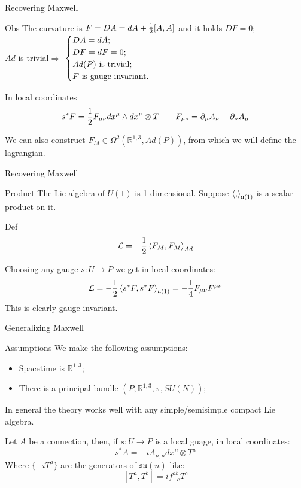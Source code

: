 \documentclass{beamer}
\begin{document}
\begin{frame}{Recovering Maxwell}
	\begin{exampleblock}{Obs}
		The curvature is $F=DA=dA+{1\over 2}[A,A]$ and it holds $DF=0;$\\
		$Ad$ is trivial$\Longrightarrow$ 
		$\begin{cases}
			DA=dA;\\
			DF=dF=0;\\
			Ad(P)\hbox{ is trivial;}\\  
			F \hbox{ is gauge invariant.}\\
		\end{cases}$
	\end{exampleblock}
	\begin{block}{In local coordinates}
		$$s^*F={1\over 2}F_{\mu\nu}dx^\mu\wedge dx^\nu\otimes T\hspace{20 pt} F_{\mu\nu}=\partial_\mu A_\nu-\partial_\nu A_\mu$$
	\end{block}
	We can also construct $F_M\in\Omega^2(\mathbb{R}^{1,3},Ad(P))$, from which we will define the lagrangian.
\end{frame}
\begin{frame}{Recovering Maxwell}
	\begin{block}{Product}
		The Lie algebra of $U(1)$ is 1 dimensional. Suppose $\braket{,}_{\mathfrak{u}(1)}$ is a scalar product on it.
	\end{block}
	\begin{exampleblock}{Def}
		$$\mathcal{L}=-{1\over 2}\braket{F_M,F_M}_{Ad}$$
	\end{exampleblock}
	Choosing any gauge $s:U\rightarrow P$ we get in local coordinates:
	$$\mathcal{L}=-{1\over 2}\braket{s^*F,s^*F}_{\mathfrak{u}(1)}=-{1\over 4}F_{\mu\nu}F^{\mu\nu}$$
	This is clearly gauge invariant.
\end{frame}
\begin{frame}{Generalizing Maxwell}
	\begin{exampleblock}{Assumptions}
	We make the following assumptions:
	\begin{itemize}
		\item Spacetime is $\mathbb{R}^{1,3}$;
		\item There is a principal bundle $(P,\mathbb{R}^{1,3},\pi,SU(N))$;
	\end{itemize}
	In general the theory works well with any simple/semisimple compact Lie algebra.
\end{exampleblock}
Let $A$ be a connection, then, if $s:U\rightarrow P$ is a local guage, in local coordinates:
$$s^*A=-iA_{\mu,a} dx^\mu\otimes T^a$$
Where $\{-iT^a\}$ are the generators of $\mathfrak{su}(n)$ like: $$[T^a,T^b]=if^{ab}_{\hspace{9pt}c}T^c$$
\end{frame}
\end{document}
